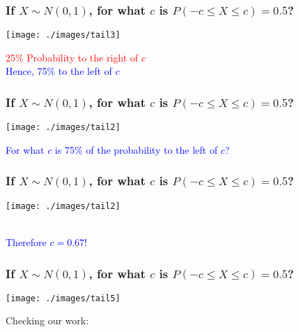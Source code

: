 \begin{frame}[t,noframenumbering]
\frametitle{If $X\sim N(0,1)$, for what $c$ is $P(-c\leq X \leq c) = 0.5$?}

\vspace{-1.5em}
\begin{center}
\texttt{[image: ./images/tail3]}
\end{center}

\vspace{-2em}
\centering
\textcolor{red}{25\% Probability to the right of $c$}\\
\textcolor{blue}{Hence, 75\% to the left of $c$}
\end{frame}
\begin{frame}[t,noframenumbering]
\frametitle{If $X\sim N(0,1)$, for what $c$ is $P(-c\leq X \leq c) = 0.5$?}

\vspace{-1.5em}
\begin{center}
\texttt{[image: ./images/tail2]}
\end{center}

\vspace{-2em}
\centering
\textcolor{blue}{For what $c$ is 75\% of the probability to the left of $c$?}\\
\end{frame}
\begin{frame}[t,noframenumbering]
\frametitle{If $X\sim N(0,1)$, for what $c$ is $P(-c\leq X \leq c) = 0.5$?}

\vspace{-1.5em}
\begin{center}
\texttt{[image: ./images/tail2]}
\end{center}

\vspace{-2em}
\centering

\\
\pause
\textcolor{blue}{Therefore $c = 0.67$!}

\end{frame}
\begin{frame}[t,noframenumbering]
\frametitle{If $X\sim N(0,1)$, for what $c$ is $P(-c\leq X \leq c) = 0.5$?}

\vspace{-1.5em}
\begin{center}
\texttt{[image: ./images/tail5]}
\end{center}

\vspace{-2em}
\centering

Checking our work: \pause {} \alert{\checkmark}

\end{frame}
